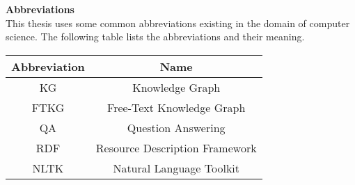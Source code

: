 \begin{center}
{\Large\bf Abbreviations}\\
This thesis uses some common abbreviations existing in the domain of computer science.
The following table lists the abbreviations and their meaning.
\\ \vspace{12pt}
\begin{tabular}{cc}
  \hline
  Abbreviation & Name \\
  \hline\hline
  KG & Knowledge Graph  \\
  FTKG & Free-Text Knowledge Graph \\
  QA & Question Answering \\
    RDF & Resource Description Framework \\
    NLTK & Natural Language Toolkit \\
  \hline
\end{tabular}
\end{center}
